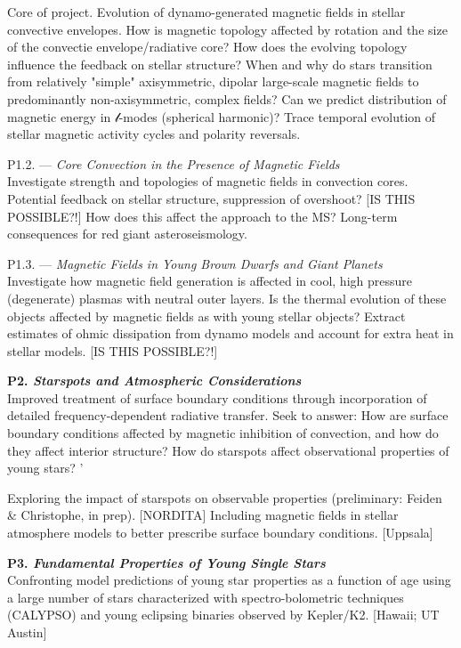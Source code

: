 \documentclass[12pt,a4paper]{article}
\begin{document}
Core of project. Evolution of dynamo-generated magnetic fields in stellar convective envelopes. 
How is magnetic topology affected by rotation and the size of the convectie envelope/radiative 
core? How does the evolving topology influence the feedback on stellar structure? When and why
do stars transition from relatively "simple" axisymmetric, dipolar large-scale magnetic fields 
to predominantly non-axisymmetric, complex fields? Can we predict distribution of magnetic 
energy in $\mathcal{l}$-modes (spherical harmonic)? Trace temporal evolution of stellar magnetic
activity cycles and polarity reversals.

P1.2. --- \emph{Core Convection in the Presence of Magnetic Fields} \\
Investigate strength and topologies of magnetic fields in convection cores. Potential feedback
on stellar structure, suppression of overshoot? [IS THIS POSSIBLE?!] How does this affect the
approach to the MS? Long-term consequences for red giant asteroseismology.


P1.3. --- \emph{Magnetic Fields in Young Brown Dwarfs and Giant Planets} \\
Investigate how magnetic field generation is affected in cool, high pressure (degenerate) plasmas with
neutral outer layers. Is the thermal evolution of these objects affected by magnetic fields as with 
young stellar objects? Extract estimates of ohmic dissipation from dynamo models 
and account for extra heat in stellar models. [IS THIS POSSIBLE?!]

\textbf{P2. \emph{Starspots and Atmospheric Considerations}} \\
Improved treatment of surface boundary conditions through incorporation of detailed frequency-dependent radiative transfer. Seek to answer: How are surface boundary conditions affected by magnetic inhibition of convection, and how do they affect interior structure? How do starspots affect observational properties of young stars? '

Exploring the impact of starspots on observable properties (preliminary: Feiden \& Christophe, in prep). [NORDITA]
Including magnetic fields in stellar atmosphere models to better prescribe surface boundary conditions. [Uppsala]

\textbf{P3. \emph{Fundamental Properties of Young Single Stars}} \\
Confronting model predictions of young star properties as a function of age using a large number of stars characterized with spectro-bolometric techniques (CALYPSO) and young eclipsing binaries observed by Kepler/K2. [Hawaii; UT Austin]
\end{document}
